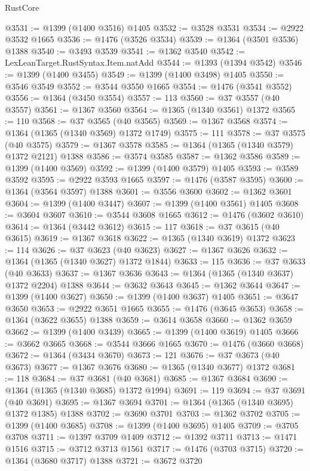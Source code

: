 \begin{lexlean}{RustCore}
\begin{coremodule}
@3531 := @1399 (@1400 @3516) @1405
@3532 := @3528 @3531
@3534 := @2922 @3532 @1665
@3536 := @1476 (@3526 @3534)
@3539 := @1364 (@3501 @3536) @1388
@3540 := @3493 @3539
@3541 := @1362 @3540
@3542 := LexLeanTarget.RustSyntax.Item.natAdd
@3544 := @1393 (@1394 @3542)
@3546 := @1399 (@1400 @3455)
@3549 := @1399 (@1400 @3498) @1405
@3550 := @3546 @3549
@3552 := @3544 @3550 @1665
@3554 := @1476 (@3541 @3552)
@3556 := @1364 (@3450 @3554)
@3557 := 113
@3560 := @37 @3557 (@40 @3557)
@3561 := @1367 @3560
@3564 := @1365 (@1340 @3561) @1372
@3565 := 110
@3568 := @37 @3565 (@40 @3565)
@3569 := @1367 @3568
@3574 := @1364 (@1365 (@1340 @3569) @1372 @1749)
@3575 := 111
@3578 := @37 @3575 (@40 @3575)
@3579 := @1367 @3578
@3585 := @1364 (@1365 (@1340 @3579) @1372 @2121) @1388
@3586 := @3574 @3585
@3587 := @1362 @3586
@3589 := @1399 (@1400 @3569)
@3592 := @1399 (@1400 @3579) @1405
@3593 := @3589 @3592
@3595 := @2922 @3593 @1665
@3597 := @1476 (@3587 @3595)
@3600 := @1364 (@3564 @3597) @1388
@3601 := @3556 @3600
@3602 := @1362 @3601
@3604 := @1399 (@1400 @3447)
@3607 := @1399 (@1400 @3561) @1405
@3608 := @3604 @3607
@3610 := @3544 @3608 @1665
@3612 := @1476 (@3602 @3610)
@3614 := @1364 (@3442 @3612)
@3615 := 117
@3618 := @37 @3615 (@40 @3615)
@3619 := @1367 @3618
@3622 := @1365 (@1340 @3619) @1372
@3623 := 114
@3626 := @37 @3623 (@40 @3623)
@3627 := @1367 @3626
@3632 := @1364 (@1365 (@1340 @3627) @1372 @1844)
@3633 := 115
@3636 := @37 @3633 (@40 @3633)
@3637 := @1367 @3636
@3643 := @1364 (@1365 (@1340 @3637) @1372 @2204) @1388
@3644 := @3632 @3643
@3645 := @1362 @3644
@3647 := @1399 (@1400 @3627)
@3650 := @1399 (@1400 @3637) @1405
@3651 := @3647 @3650
@3653 := @2922 @3651 @1665
@3655 := @1476 (@3645 @3653)
@3658 := @1364 (@3622 @3655) @1388
@3659 := @3614 @3658
@3660 := @1362 @3659
@3662 := @1399 (@1400 @3439)
@3665 := @1399 (@1400 @3619) @1405
@3666 := @3662 @3665
@3668 := @3544 @3666 @1665
@3670 := @1476 (@3660 @3668)
@3672 := @1364 (@3434 @3670)
@3673 := 121
@3676 := @37 @3673 (@40 @3673)
@3677 := @1367 @3676
@3680 := @1365 (@1340 @3677) @1372
@3681 := 118
@3684 := @37 @3681 (@40 @3681)
@3685 := @1367 @3684
@3690 := @1364 (@1365 (@1340 @3685) @1372 @1994)
@3691 := 119
@3694 := @37 @3691 (@40 @3691)
@3695 := @1367 @3694
@3701 := @1364 (@1365 (@1340 @3695) @1372 @1385) @1388
@3702 := @3690 @3701
@3703 := @1362 @3702
@3705 := @1399 (@1400 @3685)
@3708 := @1399 (@1400 @3695) @1405
@3709 := @3705 @3708
@3711 := @1397 @3709 @1409
@3712 := @1392 @3711
@3713 := @1471 @1516
@3715 := @3712 @3713 @1561
@3717 := @1476 (@3703 @3715)
@3720 := @1364 (@3680 @3717) @1388
@3721 := @3672 @3720

\end{coremodule}
\end{lexlean}
